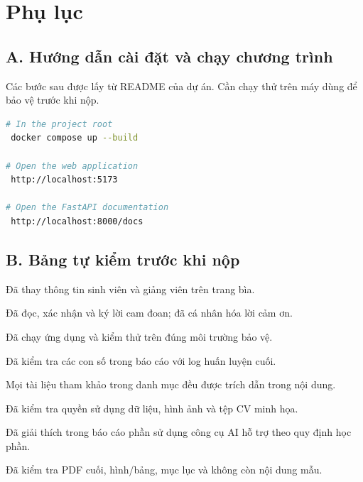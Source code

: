 \chapter{Phụ lục}

\section*{A. Hướng dẫn cài đặt và chạy chương trình}
{}

Các bước sau được lấy từ README của dự án. Cần chạy thử trên máy dùng để bảo vệ trước khi nộp.

\begin{lstlisting}[language=bash,caption={Khởi chạy ứng dụng bằng Docker Compose.}]
# In the project root
 docker compose up --build

# Open the web application
 http://localhost:5173

# Open the FastAPI documentation
 http://localhost:8000/docs
\end{lstlisting}

\section*{B. Bảng tự kiểm trước khi nộp}
{}

\begin{tukiem}
  \item Đã thay thông tin sinh viên và giảng viên trên trang bìa.
  \item Đã đọc, xác nhận và ký lời cam đoan; đã cá nhân hóa lời cảm ơn.
  \item Đã chạy ứng dụng và kiểm thử trên đúng môi trường bảo vệ.
  \item Đã kiểm tra các con số trong báo cáo với log huấn luyện cuối.
  \item Mọi tài liệu tham khảo trong danh mục đều được trích dẫn trong nội dung.
  \item Đã kiểm tra quyền sử dụng dữ liệu, hình ảnh và tệp CV minh họa.
  \item Đã giải thích trong báo cáo phần sử dụng công cụ AI hỗ trợ theo quy định học phần.
  \item Đã kiểm tra PDF cuối, hình/bảng, mục lục và không còn nội dung mẫu.
\end{tukiem}
